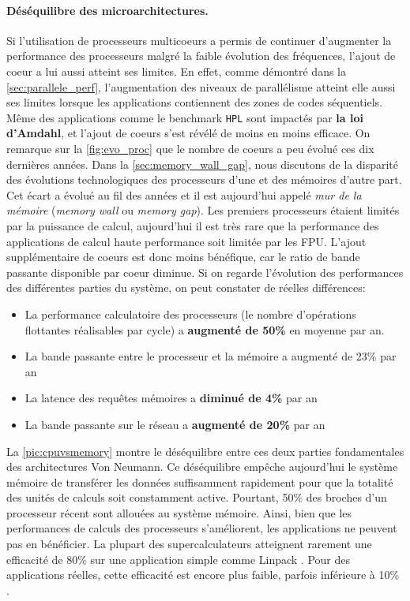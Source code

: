         \paragraph{Déséquilibre des microarchitectures.}  
        Si l'utilisation de processeurs multicoeurs a permis de continuer d'augmenter la performance des processeurs malgré la faible évolution des fréquences, l'ajout de coeur a lui aussi atteint ses limites. En effet, comme démontré dans la \autoref{sec:parallele_perf}, l'augmentation des niveaux de parallélisme atteint elle aussi ses limites lorsque les applications contiennent des zones de codes séquentiels. Même des applications comme le benchmark \verb|HPL| sont impactés par \textbf{la loi d'Amdahl}, et l'ajout de coeurs s'est révélé de moins en moins efficace. On remarque sur la \autoref{fig:evo_proc} que le nombre de coeurs a peu évolué ces dix dernières années. Dans la \autoref{sec:memory_wall_gap}, nous discutons de la disparité des évolutions technologiques des processeurs d'une et des mémoires d'autre part. Cet écart a évolué au fil des années et il est aujourd'hui appelé \textit{mur de la mémoire} \cite{Rojas1997}  (\textit{memory wall} ou \textit{memory gap}). Les premiers processeurs étaient limités par la puissance de calcul, aujourd'hui il est très rare que la performance des applications de calcul haute performance soit limitée par les FPU. L'ajout supplémentaire de coeurs est donc moins bénéfique, car le ratio de bande passante disponible par coeur diminue. 
        Si on regarde l'évolution des performances des différentes parties du système, on peut constater de réelles différences:             
        \begin{itemize}                 
            \item La performance calculatoire des processeurs (le nombre d'opérations flottantes réalisables par cycle) a \textbf{augmenté de 50\%} en moyenne par an.
            \item La bande passante entre le processeur et la mémoire a augmenté de 23\% par an                 
            \item La latence des requêtes mémoires a \textbf{diminué de 4\% } par an                 
            \item La bande passante sur le réseau a \textbf{augmenté de 20\%} par an             
        \end{itemize}
            
            La \autoref{pic:cpuvsmemory} montre le déséquilibre entre ces deux parties fondamentales des architectures Von Neumann. Ce déséquilibre empêche aujourd'hui le système mémoire de transférer les données suffisamment rapidement pour que la totalité des unités de calculs soit constamment active. Pourtant, 50\% des broches d'un processeur récent sont allouées au système mémoire. Ainsi, bien que les performances de calculs des processeurs s'améliorent, les applications ne peuvent pas en bénéficier. La plupart des supercalculateurs atteignent rarement une efficacité de 80\% sur une application simple comme Linpack \cite{Dongarra2003}. Pour des applications réelles, cette efficacité est encore plus faible, parfois inférieure à 10\% \cite{Oliker2005}.
            
